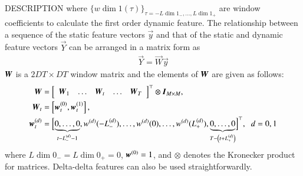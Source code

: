 \begin{qsection}{DESCRIPTION}
 where $\{ w\dim{1}(\tau)\}_{\tau=-L\dim{1}_{-},\ldots,L\dim{1}_{+}}$ are window
 coefficients to calculate the first order dynamic feature.  The relationship between
 a sequence of the static feature vectors $\vec{y}$ and that of the static and
 dynamic feature vectors $\vec{Y}$ can be arranged in a matrix form as
 \begin{align*}
  \vec{Y} = \vec{W} \vec{y}
 \end{align*}
 $\mbox{\boldmath $W$}$ is a $2DT \times DT$ window matrix and the elements of $\mbox{\boldmath $W$}$ are given as
 follows:
 \begin{align*}
 \mbox{\boldmath $W$} &= \left[
         \begin{array}{ccccc}
          \mbox{\boldmath $W$}_{1}
           &
           \ldots
           &
           \mbox{\boldmath $W$}_{t}
           &
           \ldots
           &
           \mbox{\boldmath $W$}_{T}
         \end{array}
         \right]^{\top}\otimes \mbox{\boldmath $I$}_{M\times M},\\
 \mbox{\boldmath $W$}_{t} &= \left[\mbox{\boldmath $w$}^{(0)}_t, \mbox{\boldmath $w$}^{(1)}_{t}\right],\\
 \mbox{\boldmath $w$}^{(d)}_{t} &= \Bigl[\underbrace{0,\ldots,0}_{t-L^{(d)}_{-}-1},
  w^{(d)}(-L^{(d)}_{-}),\ldots,w^{(d)}(0),\nonumber \ldots,
  w^{(d)}(L^{(d)}_{+}),\underbrace{0,\ldots,0}_{T-\left(t+L^{(d)}_{+}\right)}
  \Bigl]^{\top}, \hspace{2mm} d=0,1
 \end{align*}
 where $L\dim{0}_{-} = L\dim{0}_{+} = 0$, $\mbox{\boldmath $w$}^{(0)} = 1$, and $\otimes$ denotes the
 Kronecker product for matrices. Delta-delta features can also be used
 straightforwardly.


\end{qsection}
